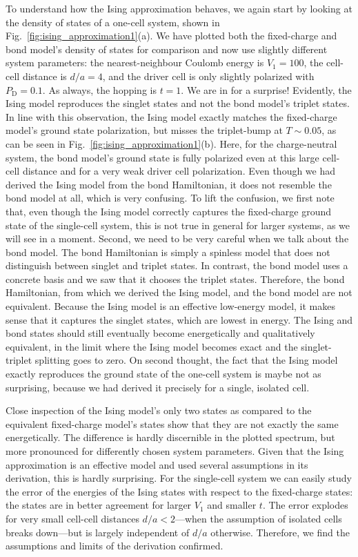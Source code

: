 To understand how the Ising approximation behaves, we again start by looking at
the density of states of a one-cell system, shown in
Fig.~\ref{fig:ising_approximation1}(a). We have plotted both the fixed-charge
and bond model's density of states for comparison and now use slightly different
system parameters: the nearest-neighbour Coulomb energy is $V_1 = 100$, the
cell-cell distance is $d/a = 4$, and the driver cell is only slightly polarized
with $P_\text{D} = 0.1$. As always, the hopping is $t=1$. We are in for a surprise!
Evidently, the Ising model reproduces the singlet states and not the bond
model's triplet states. In line with this observation, the Ising model exactly
matches the fixed-charge model's ground state polarization, but misses the
triplet-bump at $T \sim 0.05$, as can be seen in
Fig.~\ref{fig:ising_approximation1}(b). Here, for the charge-neutral system,
the bond model's ground state is fully polarized even at this large cell-cell
distance and for a very weak driver cell polarization. Even though we had
derived the Ising model from the bond Hamiltonian, it does not resemble the bond
model at all, which is very confusing. To lift the confusion, we first note
that, even though the Ising model correctly captures the fixed-charge ground
state of the single-cell system, this is not true in general for larger systems,
as we will see in a moment. Second, we need to be very careful when we talk
about the bond model. The bond Hamiltonian is simply a spinless model that does
not distinguish between singlet and triplet states. In contrast, the bond model
uses a concrete basis and we saw that it chooses the triplet states. Therefore,
the bond Hamiltonian, from which we derived the Ising model, and the bond model
are not equivalent. Because the Ising model is an effective low-energy model, it
makes sense that it captures the singlet states, which are lowest in energy. The
Ising and bond states should still eventually become energetically and
qualitatively equivalent, in the limit where the Ising model becomes exact and
the singlet-triplet splitting goes to zero. On second thought, the fact that the
Ising model exactly reproduces the ground state of the one-cell system is maybe
not as surprising, because we had derived it precisely for a single, isolated
cell.

Close inspection of the Ising model's only two states as compared to the
equivalent fixed-charge model's states show that they are not exactly the same
energetically. The difference is hardly discernible in the plotted spectrum, but
more pronounced for differently chosen system parameters. Given that the Ising
approximation is an effective model and used several assumptions in its
derivation, this is hardly surprising. For the single-cell system we can easily
study the error of the energies of the Ising states with respect to the
fixed-charge states: the states are in better agreement for larger $V_1$ and
smaller $t$. The error explodes for very small cell-cell distances $d/a <
2$---when the assumption of isolated cells breaks down---but is largely
independent of $d/a$ otherwise. Therefore, we find the assumptions and limits of
the derivation confirmed.

